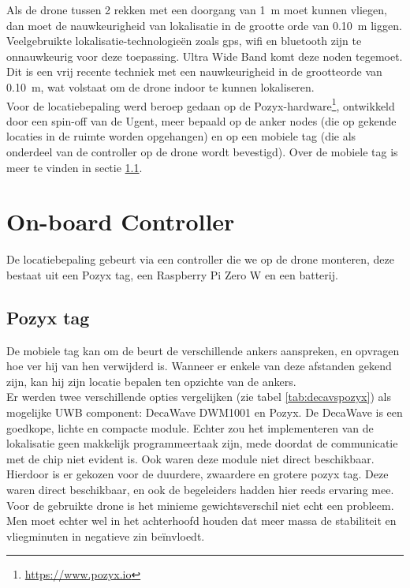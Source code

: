 Als de drone tussen 2 rekken met een doorgang van \SI{1}{\m} moet kunnen vliegen, dan moet de nauwkeurigheid van lokalisatie in de grootte orde van \SI{0.10}{\m} liggen. Veelgebruikte lokalisatie-technologie\"en zoals gps, wifi en bluetooth zijn te onnauwkeurig voor deze toepassing. Ultra Wide Band komt deze noden tegemoet. Dit is een vrij recente techniek met een nauwkeurigheid in de grootteorde van \SI{0.10}{\m}, wat volstaat om de drone indoor te kunnen lokaliseren.\\

Voor de locatiebepaling werd beroep gedaan op de Pozyx-hardware\footnote{\url{https://www.pozyx.io}}, ontwikkeld door een spin-off van de Ugent, meer bepaald op de anker nodes (die op gekende locaties in de ruimte worden opgehangen) en op een mobiele tag (die als onderdeel van de controller op de drone wordt bevestigd). 
Over de mobiele tag is meer te vinden in sectie \ref{sec:pozyx_tag}.

\section{On-board Controller} \label{sec:onboard_controller}

De locatiebepaling gebeurt via een controller die we op de drone monteren, deze bestaat uit een Pozyx tag, een Raspberry Pi Zero W en een batterij.

\subsection{Pozyx tag}  \label{sec:pozyx_tag}
De mobiele tag kan om de beurt de verschillende ankers aanspreken, en opvragen hoe ver hij van hen verwijderd is. Wanneer er enkele van deze afstanden gekend zijn, kan hij zijn locatie bepalen ten opzichte van de ankers.\\

Er werden twee verschillende opties vergelijken (zie tabel \ref{tab:decavspozyx}) als mogelijke UWB component: DecaWave DWM1001 en Pozyx. De DecaWave is een goedkope, lichte en compacte module. Echter zou het implementeren van de lokalisatie geen makkelijk programmeertaak zijn, mede doordat de communicatie met de chip niet evident is. Ook waren deze module niet direct beschikbaar. Hierdoor is er gekozen voor de duurdere, zwaardere en grotere pozyx tag. Deze waren direct beschikbaar, en ook de begeleiders hadden hier reeds ervaring mee. Voor de gebruikte drone is het minieme gewichtsverschil niet echt een probleem. Men moet echter wel in het achterhoofd houden dat meer massa de stabiliteit en vliegminuten in negatieve zin be\"invloedt.\\

